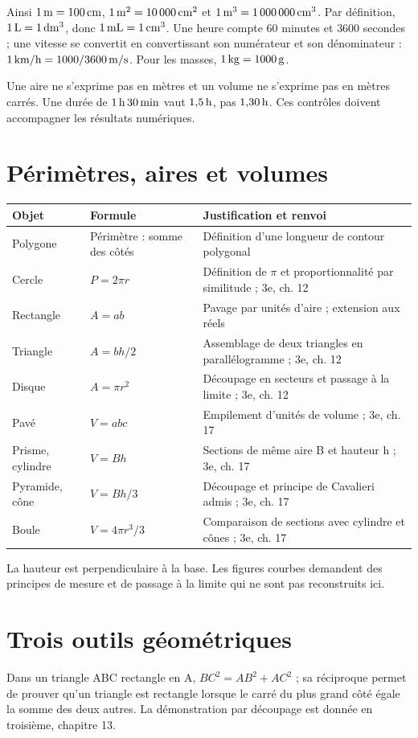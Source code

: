 \documentclass[11pt,a4paper,oneside]{book}
\begin{document}
Ainsi $1\,\mathrm{m}=100\,\mathrm{cm}$, $1\,\mathrm{m^2}=10\,000\,\mathrm{cm^2}$ et $1\,\mathrm{m^3}=1\,000\,000\,\mathrm{cm^3}$. Par définition, $1\,\mathrm{L}=1\,\mathrm{dm^3}$, donc $1\,\mathrm{mL}=1\,\mathrm{cm^3}$. Une heure compte $60$ minutes et $3600$ secondes ; une vitesse se convertit en convertissant son numérateur et son dénominateur : $1\,\mathrm{km/h}=1000/3600\,\mathrm{m/s}$. Pour les masses, $1\,\mathrm{kg}=1000\,\mathrm{g}$.

Une aire ne s'exprime pas en mètres et un volume ne s'exprime pas en mètres carrés. Une durée de $1\,\mathrm{h}\,30\,\mathrm{min}$ vaut $1{,}5\,\mathrm{h}$, pas $1{,}30\,\mathrm{h}$. Ces contrôles doivent accompagner les résultats numériques.
\section{Périmètres, aires et volumes}
\begin{center}\small\begin{tabularx}{\textwidth}{lXX}\toprule
Objet & Formule & Justification et renvoi\\\midrule
Polygone & Périmètre : somme des côtés & Définition d'une longueur de contour polygonal\\
Cercle & $P=2\pi r$ & Définition de $\pi$ et proportionnalité par similitude ; 3e, ch. 12\\
Rectangle & $A=ab$ & Pavage par unités d'aire ; extension aux réels\\
Triangle & $A=bh/2$ & Assemblage de deux triangles en parallélogramme ; 3e, ch. 12\\
Disque & $A=\pi r^2$ & Découpage en secteurs et passage à la limite ; 3e, ch. 12\\
Pavé & $V=abc$ & Empilement d'unités de volume ; 3e, ch. 17\\
Prisme, cylindre & $V=Bh$ & Sections de même aire B et hauteur h ; 3e, ch. 17\\
Pyramide, cône & $V=Bh/3$ & Découpage et principe de Cavalieri admis ; 3e, ch. 17\\
Boule & $V=4\pi r^3/3$ & Comparaison de sections avec cylindre et cônes ; 3e, ch. 17\\\bottomrule
\end{tabularx}\end{center}
La hauteur est perpendiculaire à la base. Les figures courbes demandent des principes de mesure et de passage à la limite qui ne sont pas reconstruits ici.
\section{Trois outils géométriques}
Dans un triangle ABC rectangle en A, $BC^2=AB^2+AC^2$ ; sa réciproque permet de prouver qu'un triangle est rectangle lorsque le carré du plus grand côté égale la somme des deux autres. La démonstration par découpage est donnée en troisième, chapitre 13.
\end{document}
